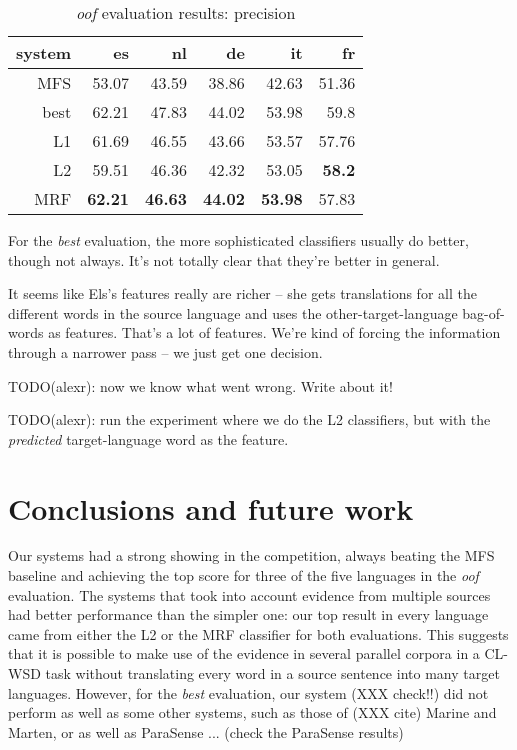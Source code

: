 \documentclass[11pt,letterpaper]{article}
\begin{document}
\begin{table}[t!]
  \begin{center}
    \begin{tabular}{|r|r|r|r|r|r|}
      \hline
      system   & es    & nl    & de    &  it   & fr \\
      \hline
    MFS & 53.07          & 43.59              & 38.86          & 42.63          & 51.36 \\
   best & 62.21          & 47.83              & 44.02          & 53.98          & 59.8 \\
      \hline
           L1  & 61.69          & 46.55              & 43.66          & 53.57          & 57.76 \\
           L2  & 59.51          & 46.36              & 42.32          & 53.05          & \textbf{58.2} \\
           MRF & \textbf{62.21} & \textbf{46.63}     & \textbf{44.02} & \textbf{53.98} & 57.83 \\
      \hline
    \end{tabular}
  \caption{\emph{oof} evaluation results: precision}
  \label{table:resultsoof}
  \end{center}
\end{table}

For the \emph{best} evaluation, the more sophisticated classifiers usually do
better, though not always. It's not totally clear that they're better in
general.

It seems like Els's features really are richer -- she gets translations for all
the different words in the source language and uses the other-target-language
bag-of-words as features. That's a lot of features. We're kind of forcing the
information through a narrower pass -- we just get one decision.

TODO(alexr): now we know what went wrong. Write about it!

TODO(alexr): run the experiment where we do the L2 classifiers, but with the
\emph{predicted} target-language word as the feature.

\section{Conclusions and future work}
Our systems had a strong showing in the competition, always beating the MFS
baseline and achieving the top score for three of the five languages in the
\emph{oof} evaluation. The systems that took into account evidence from
multiple sources had better performance than the simpler one: our top result in
every language came from either the L2 or the MRF classifier for
both evaluations. This suggests that it is possible to make use of the evidence
in several parallel corpora in a CL-WSD task without translating every word in
a source sentence into many target languages. However, for the \emph{best}
evaluation, our system (XXX check!!) did not perform as well as some other
systems, such as those of (XXX cite) Marine and Marten, or as well as ParaSense
... (check the ParaSense results)
\end{document}
